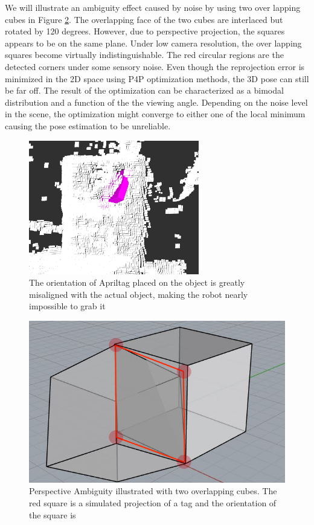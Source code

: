 We will illustrate an ambiguity effect caused by noise by using two over lapping cubes in Figure \ref{fig:cube}. The overlapping face of the two cubes are interlaced but rotated by 120 degrees. However, due to perspective projection, the squares appears to be on the same plane. Under low camera resolution, the over lapping squares become virtually indistinguishable. The red circular regions are the detected corners under some sensory noise. Even though the reprojection error is minimized in the 2D space using P4P optimization methods, the 3D pose can still be far off. The result of the optimization can be characterized as a bimodal distribution and a function of the the viewing angle. Depending on the noise level in the scene, the optimization might converge to either one of the local minimum causing the pose estimation to be unreliable.
\begin{figure}
\centering
\includegraphics[width=\columnwidth]{figs/mismatch_tag}
\caption{The orientation of Apriltag placed on the object is greatly misaligned with the actual object, making the robot nearly impossible to grab it}
\label{fig:mismatch}
\end{figure}

\begin{figure}
\centering
\includegraphics[width=\columnwidth]{figs/perspective_fig}
\caption{Perspective Ambiguity illustrated with two overlapping cubes. The red square is a simulated projection of a tag and the orientation of the square is }
\label{fig:cube}
\end{figure}
